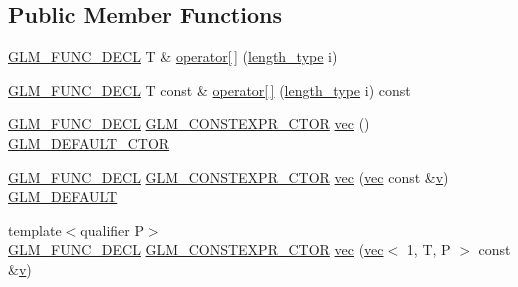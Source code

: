 \subsection*{Public Member Functions}
\begin{DoxyCompactItemize}
\item 
\hyperlink{setup_8hpp_ab2d052de21a70539923e9bcbf6e83a51}{G\+L\+M\+\_\+\+F\+U\+N\+C\+\_\+\+D\+E\+CL} T \& \hyperlink{structglm_1_1vec_3_011_00_01_t_00_01_q_01_4_a3ddc7f24ef7c4820534a14043fb51946}{operator\mbox{[}$\,$\mbox{]}} (\hyperlink{structglm_1_1vec_3_011_00_01_t_00_01_q_01_4_a37415eee3b59cf93cdb752a2b30fe5e6}{length\+\_\+type} i)
\item 
\hyperlink{setup_8hpp_ab2d052de21a70539923e9bcbf6e83a51}{G\+L\+M\+\_\+\+F\+U\+N\+C\+\_\+\+D\+E\+CL} T const  \& \hyperlink{structglm_1_1vec_3_011_00_01_t_00_01_q_01_4_aca63447e88983b17ea1cb8698f9f8018}{operator\mbox{[}$\,$\mbox{]}} (\hyperlink{structglm_1_1vec_3_011_00_01_t_00_01_q_01_4_a37415eee3b59cf93cdb752a2b30fe5e6}{length\+\_\+type} i) const
\item 
\hyperlink{setup_8hpp_ab2d052de21a70539923e9bcbf6e83a51}{G\+L\+M\+\_\+\+F\+U\+N\+C\+\_\+\+D\+E\+CL} \hyperlink{setup_8hpp_ad34178a09666081abdb573c14d1f4a5a}{G\+L\+M\+\_\+\+C\+O\+N\+S\+T\+E\+X\+P\+R\+\_\+\+C\+T\+OR} \hyperlink{structglm_1_1vec_3_011_00_01_t_00_01_q_01_4_a4fda39784b2ba699a88c6a4c2b94fc7b}{vec} () \hyperlink{setup_8hpp_afb97a4e995bc004c0cbbfa22125b80ba}{G\+L\+M\+\_\+\+D\+E\+F\+A\+U\+L\+T\+\_\+\+C\+T\+OR}
\item 
\hyperlink{setup_8hpp_ab2d052de21a70539923e9bcbf6e83a51}{G\+L\+M\+\_\+\+F\+U\+N\+C\+\_\+\+D\+E\+CL} \hyperlink{setup_8hpp_ad34178a09666081abdb573c14d1f4a5a}{G\+L\+M\+\_\+\+C\+O\+N\+S\+T\+E\+X\+P\+R\+\_\+\+C\+T\+OR} \hyperlink{structglm_1_1vec_3_011_00_01_t_00_01_q_01_4_ac61412a4328fca49ded68a788eee5385}{vec} (\hyperlink{structglm_1_1vec}{vec} const \&\hyperlink{_s_d_l__opengl_8h_a10a82eabcb59d2fcd74acee063775f90}{v}) \hyperlink{setup_8hpp_aefce7051c376a64ba89fa93a9f63bc2c}{G\+L\+M\+\_\+\+D\+E\+F\+A\+U\+LT}
\item 
{\footnotesize template$<$qualifier P$>$ }\\\hyperlink{setup_8hpp_ab2d052de21a70539923e9bcbf6e83a51}{G\+L\+M\+\_\+\+F\+U\+N\+C\+\_\+\+D\+E\+CL} \hyperlink{setup_8hpp_ad34178a09666081abdb573c14d1f4a5a}{G\+L\+M\+\_\+\+C\+O\+N\+S\+T\+E\+X\+P\+R\+\_\+\+C\+T\+OR} \hyperlink{structglm_1_1vec_3_011_00_01_t_00_01_q_01_4_a335f0b237f2efd588837a62b9a8e7306}{vec} (\hyperlink{structglm_1_1vec}{vec}$<$ 1, T, P $>$ const \&\hyperlink{_s_d_l__opengl_8h_a10a82eabcb59d2fcd74acee063775f90}{v})

\end{DoxyCompactItemize}

